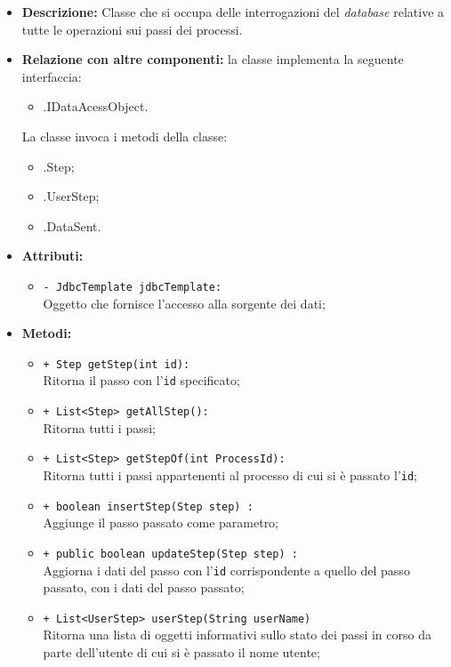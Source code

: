 \begin{flushleft}
\begin{itemize}
\item \textbf{Descrizione:} Classe che si occupa delle interrogazioni del \textit{database} relative a tutte le operazioni sui passi dei processi.
\item \textbf{Relazione con altre componenti:} la classe implementa la seguente interfaccia:
		\begin{itemize}
			\item \smodel{}.IDataAcessObject.
		\end{itemize}
		La classe invoca i metodi della classe:
		\begin{itemize}
			\item \smodel{}.Step;
			\item \smodel{}.UserStep;
			\item \smodel{}.DataSent.
		\end{itemize}
\item \textbf{Attributi:}
\begin{sloppypar}
\begin{itemize}
\item \texttt{- JdbcTemplate jdbcTemplate:}\\ Oggetto che fornisce l'accesso alla sorgente dei dati;
\end{itemize}
\end{sloppypar}
\item \textbf{Metodi:}
\begin{sloppypar}
\begin{itemize}
\item \texttt{+ Step getStep(int id):}\\ Ritorna il passo con l'\texttt{id} specificato; 
\item \texttt{+ List<Step> getAllStep():}\\ Ritorna tutti i passi;
\item \texttt{+ List<Step> getStepOf(int ProcessId):}\\ Ritorna tutti i passi appartenenti al processo di cui si è passato l'\texttt{id};
\item \texttt{+ boolean insertStep(Step step) :}\\ Aggiunge il passo passato come parametro;
\item \texttt{+ public boolean updateStep(Step step) :}\\ Aggiorna i dati del passo con l'\texttt{id} corrispondente a quello del passo passato, con i dati del passo passato;
\item \texttt{+ List<UserStep> userStep(String userName)}\\ Ritorna una lista di oggetti informativi sullo stato dei passi in corso da parte dell'utente di cui si è passato il nome utente;

\end{itemize}
\end{sloppypar}
\end{itemize}
\end{flushleft}
